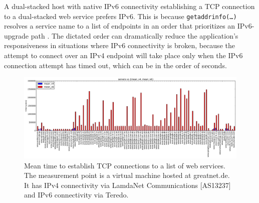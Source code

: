 A dual-stacked host with native IPv6 connectivity establishing a TCP
connection to a dual-stacked web service prefers IPv6. This is because
\texttt{getaddrinfo(\ldots)} resolves a service name to a list of endpoints in
an order that prioritizes an IPv6-upgrade path \cite{rfc6724}.  The dictated
order can dramatically reduce the application's responsiveness in situations
where IPv6 connectivity is broken, because the attempt to connect over an IPv4
endpoint will take place only when the IPv6 connection attempt has timed out,
which can be in the order of seconds.

\begin{figure}[t]
\centering
\includegraphics[width=1.0\textwidth]{figures/t28972-mean}
\caption{Mean time to establish TCP connections to a list of web services. The
measurement point is a virtual machine hosted at greatnet.de. It has IPv4
connectivity via LamdaNet Communications [AS13237] and IPv6 connectivity via
Teredo.}
\label{fig:t28972-mean}
\end{figure}



